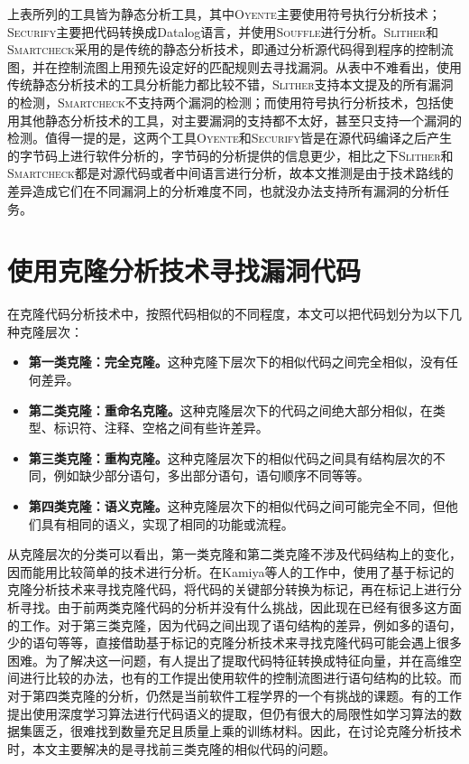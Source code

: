 上表所列的工具皆为静态分析工具，其中\textsc{Oyente}主要使用符号执行分析技术；\textsc{Securify}主要把代码转换成Datalog语言，并使用\textsc{Souffle}进行分析。\textsc{Slither}和\textsc{Smartcheck}采用的是传统的静态分析技术，即通过分析源代码得到程序的控制流图，并在控制流图上用预先设定好的匹配规则去寻找漏洞。从表中不难看出，使用传统静态分析技术的工具分析能力都比较不错，\textsc{Slither}支持本文提及的所有漏洞的检测，\textsc{Smartcheck}不支持两个漏洞的检测；而使用符号执行分析技术，包括使用其他静态分析技术的工具，对主要漏洞的支持都不太好，甚至只支持一个漏洞的检测。值得一提的是，这两个工具\textsc{Oyente}和\textsc{Securify}皆是在源代码编译之后产生的字节码上进行软件分析的，字节码的分析提供的信息更少，相比之下\textsc{Slither}和\textsc{Smartcheck}都是对源代码或者中间语言进行分析，故本文推测是由于技术路线的差异造成它们在不同漏洞上的分析难度不同，也就没办法支持所有漏洞的分析任务。

\section{使用克隆分析技术寻找漏洞代码}

在克隆代码分析技术中，按照代码相似的不同程度，本文可以把代码划分为以下几种克隆层次：
\begin{itemize}
  \item \textbf{第一类克隆：完全克隆。}这种克隆下层次下的相似代码之间完全相似，没有任何差异。
  \item \textbf{第二类克隆：重命名克隆。}这种克隆层次下的代码之间绝大部分相似，在类型、标识符、注释、空格之间有些许差异。
  \item \textbf{第三类克隆：重构克隆。}这种克隆层次下的相似代码之间具有结构层次的不同，例如缺少部分语句，多出部分语句，语句顺序不同等等。
  \item \textbf{第四类克隆：语义克隆。}这种克隆层次下的相似代码之间可能完全不同，但他们具有相同的语义，实现了相同的功能或流程。
\end{itemize}
从克隆层次的分类可以看出，第一类克隆和第二类克隆不涉及代码结构上的变化，因而能用比较简单的技术进行分析。在Kamiya等人的工作中\cite{ccfinder}，使用了基于标记的克隆分析技术来寻找克隆代码，将代码的关键部分转换为标记，再在标记上进行分析寻找。由于前两类克隆代码的分析并没有什么挑战，因此现在已经有很多这方面的工作。对于第三类克隆，因为代码之间出现了语句结构的差异，例如多的语句，少的语句等等，直接借助基于标记的克隆分析技术来寻找克隆代码可能会遇上很多困难。为了解决这一问题，有人提出了提取代码特征转换成特征向量，并在高维空间进行比较的办法\cite{deckard}，也有的工作提出使用软件的控制流图进行语句结构的比较\cite{cfgcompare}。而对于第四类克隆的分析，仍然是当前软件工程学界的一个有挑战的课题。有的工作提出使用深度学习算法进行代码语义的提取\cite{bugsjs}，但仍有很大的局限性如学习算法的数据集匮乏，很难找到数量充足且质量上乘的训练材料。因此，在讨论克隆分析技术时，本文主要解决的是寻找前三类克隆的相似代码的问题。

